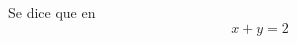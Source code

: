 \documentclass[11pt,a4paper]{book}
\begin{document}
 Se dice que  en \cite{khalil:2002}
\begin{equation}
    x+y=2
\end{equation}


\end{document}
